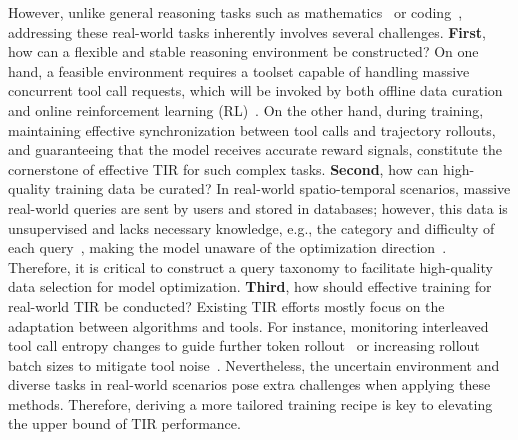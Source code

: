 \documentclass{article} %
\newcommand{\eg}{e.g.}
\begin{document}
However, unlike general reasoning tasks such as mathematics~\cite{rstar2agent} or coding~\cite{glm_4.5}, addressing these real-world tasks inherently involves several challenges. \textbf{First}, how can a flexible and stable reasoning environment be constructed? On one hand, a feasible environment requires a toolset capable of handling massive concurrent tool call requests, which will be invoked by both offline data curation and online reinforcement learning (RL)~\cite{agentic_limits}. On the other hand, during training, maintaining effective synchronization between tool calls and trajectory rollouts, and guaranteeing that the model receives accurate reward signals, constitute the cornerstone of effective TIR for such complex tasks. \textbf{Second}, how can high-quality training data be curated? In real-world spatio-temporal scenarios, massive real-world queries are sent by users and stored in databases; however, this data is unsupervised and lacks necessary knowledge, \eg, the category and difficulty of each query~\cite{demystify_agentic_rl}, making the model unaware of the optimization direction~\cite{difficulty_know}. Therefore, it is critical to construct a query taxonomy to facilitate high-quality data selection for model optimization. \textbf{Third}, how should effective training for real-world TIR be conducted? Existing TIR efforts mostly focus on the adaptation between algorithms and tools. For instance, monitoring interleaved tool call entropy changes to guide further token rollout~\cite{arpo} or increasing rollout batch sizes to mitigate tool noise~\cite{rstar2agent}. Nevertheless, the uncertain environment and diverse tasks in real-world scenarios pose extra challenges when applying these methods. Therefore, deriving a more tailored training recipe is key to elevating the upper bound of TIR performance.    

 
\end{document}
